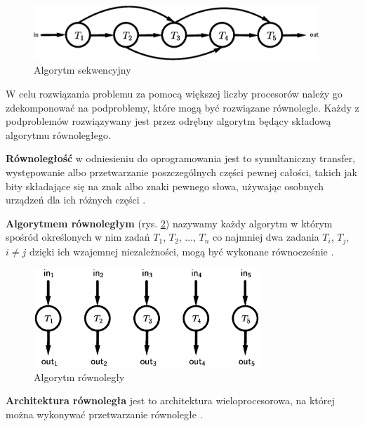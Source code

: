 \begin{figure}[h]
\centering
\includegraphics[width=29em]{images/Rys2.eps}
\caption{Algorytm sekwencyjny}
\label{fig:sequential}
\end{figure}

W celu rozwiązania problemu za pomocą większej liczby procesorów należy go zdekomponować na podproblemy, które mogą być rozwiązane równolegle. Każdy z podproblemów rozwiązywany jest przez odrębny algorytm będący składową algorytmu równoległego.


\begin{definicja}[Równoległość]\label{def:rownoleglosc}
\textbf{Równoległość} w odniesieniu do oprogramowania jest to symultaniczny transfer, występowanie albo przetwarzanie poszczególnych części pewnej całości, takich jak bity składające się na znak albo znaki pewnego słowa, używając osobnych urządzeń dla ich różnych części \cite{IEEE}.
\end{definicja}


\begin{definicja}\label{def:algorytm_rownolegly}
\textbf{Algorytmem równoległym} (rys.  \ref{fig:parallel}) nazywamy każdy algorytm w którym spośród określonych w nim zadań \(T_1\), \(T_2\), \(\dots\), \(T_n\) co najmniej dwa zadania \(T_i\), \(T_j\), \(i\neq j\) dzięki ich wzajemnej niezależności, mogą być wykonane równocześnie \cite{APC2011}.\\
\end{definicja}

\begin{figure}[h]
\centering
\includegraphics[width=23em]{images/Rys1.eps}
\caption{Algorytm równoległy}
\label{fig:parallel}
\end{figure}


\begin{definicja}\label{def:arch_rownolegla}
\textbf{Architektura równoległa} jest to architektura wieloprocesorowa, na której można wykonywać przetwarzanie równoległe \cite{IEEE}.
\end{definicja}

